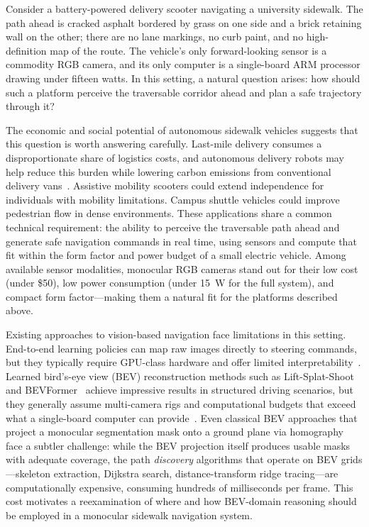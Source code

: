 \documentclass[12pt,letterpaper,oneside]{report}
\begin{document}
Consider a battery-powered delivery scooter navigating a university sidewalk. The path ahead is cracked asphalt bordered by grass on one side and a brick retaining wall on the other; there are no lane markings, no curb paint, and no high-definition map of the route. The vehicle's only forward-looking sensor is a commodity RGB camera, and its only computer is a single-board ARM processor drawing under fifteen watts. In this setting, a natural question arises: how should such a platform perceive the traversable corridor ahead and plan a safe trajectory through it?

The economic and social potential of autonomous sidewalk vehicles suggests that this question is worth answering carefully. Last-mile delivery consumes a disproportionate share of logistics costs, and autonomous delivery robots may help reduce this burden while lowering carbon emissions from conventional delivery vans~\cite{starship2022}. Assistive mobility scooters could extend independence for individuals with mobility limitations. Campus shuttle vehicles could improve pedestrian flow in dense environments. These applications share a common technical requirement: the ability to perceive the traversable path ahead and generate safe navigation commands in real time, using sensors and compute that fit within the form factor and power budget of a small electric vehicle. Among available sensor modalities, monocular RGB cameras stand out for their low cost (under \$50), low power consumption (under 15~W for the full system), and compact form factor---making them a natural fit for the platforms described above.

Existing approaches to vision-based navigation face limitations in this setting. End-to-end learning policies can map raw images directly to steering commands, but they typically require GPU-class hardware and offer limited interpretability~\cite{e2e_nav_policies}. Learned bird's-eye view (BEV) reconstruction methods such as Lift-Splat-Shoot~\cite{lift_splat_shoot} and BEVFormer~\cite{bevformer} achieve impressive results in structured driving scenarios, but they generally assume multi-camera rigs and computational budgets that exceed what a single-board computer can provide~\cite{zhao2024bev}. Even classical BEV approaches that project a monocular segmentation mask onto a ground plane via homography face a subtler challenge: while the BEV projection itself produces usable masks with adequate coverage, the path \emph{discovery} algorithms that operate on BEV grids---skeleton extraction, Dijkstra search, distance-transform ridge tracing---are computationally expensive, consuming hundreds of milliseconds per frame. This cost motivates a reexamination of where and how BEV-domain reasoning should be employed in a monocular sidewalk navigation system.
\end{document}
